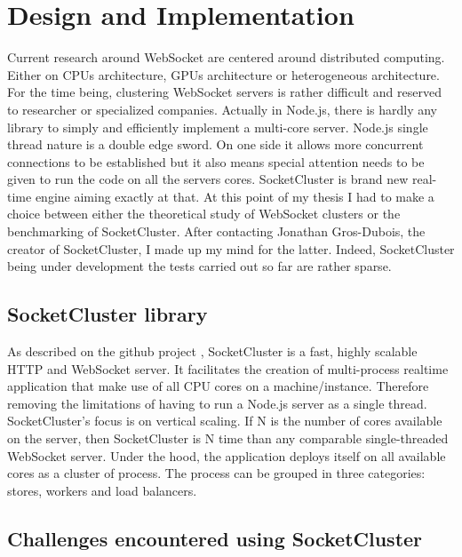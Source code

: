 \chapter{Design and Implementation} 
\label{Chapter3} 

Current research around WebSocket are centered around distributed computing. Either
on CPUs architecture, GPUs architecture or heterogeneous architecture. For the
time being, clustering WebSocket servers is rather difficult and reserved to
researcher or specialized companies. Actually in Node.js, there is hardly any
library to simply and efficiently implement a multi-core server.  Node.js
single thread nature is a double edge sword. On one side it allows more
concurrent connections to be established but it also means special attention
needs to be given to run the code on all the servers cores. SocketCluster is
brand new real-time engine aiming exactly at that.  At this point of my thesis
I had to make a choice between either the theoretical study of WebSocket
clusters or the benchmarking of SocketCluster. After contacting Jonathan
Gros-Dubois, the creator of SocketCluster, I made up my mind for the latter.
Indeed, SocketCluster being under development the tests carried out so far are
rather sparse. \\

\section{SocketCluster library}

As described on the github project  \citep{Reference38}, SocketCluster is a
fast, highly scalable HTTP and WebSocket server. It facilitates the creation of
multi-process realtime application that make use of all CPU cores on a
machine/instance. Therefore removing the limitations of having to run a Node.js
server as a single thread.  SocketCluster's focus is on vertical scaling. If N
is the number of cores available on the server, then SocketCluster is N time
than any comparable single-threaded WebSocket server. Under the hood, the
application deploys itself on all available cores as a cluster of process. The
process can be grouped in three categories: stores, workers and load balancers.\\

\section{Challenges encountered using SocketCluster}

